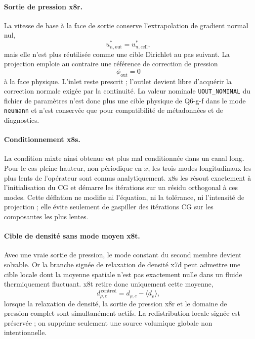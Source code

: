 \documentclass[11pt,a4paper]{article}
\begin{document}
\paragraph{Sortie de pression x8r.}
La vitesse de base à la face de sortie conserve l'extrapolation de gradient normal nul,
\begin{equation}
  u^*_{n,\mathrm{out}}=u^*_{n,\mathrm{cell}},
\end{equation}
mais elle n'est plus réutilisée comme une cible Dirichlet au pas suivant. La projection emploie au contraire une référence de correction de pression
\begin{equation}
  \phi_{\mathrm{out}}=0
\end{equation}
à la face physique. L'inlet reste prescrit ; l'outlet devient libre d'acquérir la correction normale exigée par la continuité. La valeur nominale \texttt{UOUT\_NOMINAL} du fichier de paramètres n'est donc plus une cible physique de Q6-g-f dans le mode \texttt{neumann} et n'est conservée que pour compatibilité de métadonnées et de diagnostics.

\paragraph{Conditionnement x8s.}
La condition mixte ainsi obtenue est plus mal conditionnée dans un canal long. Pour le cas pleine hauteur, non périodique en $x$, les trois modes longitudinaux les plus lents de l'opérateur sont connus analytiquement. x8s les résout exactement à l'initialisation du CG et démarre les itérations sur un résidu orthogonal à ces modes. Cette déflation ne modifie ni l'équation, ni la tolérance, ni l'intensité de projection ; elle évite seulement de gaspiller des itérations CG sur les composantes les plus lentes.

\paragraph{Cible de densité sans mode moyen x8t.}
Avec une vraie sortie de pression, le mode constant du second membre devient solvable. Or la branche signée de relaxation de densité x7d peut admettre une cible locale dont la moyenne spatiale n'est pas exactement nulle dans un fluide thermiquement fluctuant. x8t retire donc uniquement cette moyenne,
\begin{equation}
  d_{\rho,c}^{\,\mathrm{centred}}
    =d_{\rho,c}-\langle d_\rho\rangle,
\end{equation}
lorsque la relaxation de densité, la sortie de pression x8r et le domaine de pression complet sont simultanément actifs. La redistribution locale signée est préservée ; on supprime seulement une source volumique globale non intentionnelle.
\end{document}
